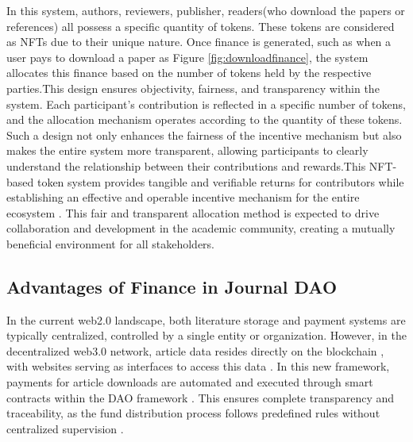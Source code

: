\documentclass[lettersize,journal]{IEEEtran}
\begin{document}
In this system, authors, reviewers, publisher, readers(who download the papers or references) all possess a specific quantity of tokens. These tokens are considered as NFTs due to their unique nature. Once finance is generated, such as when a user pays to download a paper as Figure \ref{fig:downloadfinance}, the system allocates this finance based on the number of tokens held by the respective parties.This design ensures objectivity, fairness, and transparency within the system. Each participant's contribution is reflected in a specific number of tokens, and the allocation mechanism operates according to the quantity of these tokens. Such a design not only enhances the fairness of the incentive mechanism but also makes the entire system more transparent, allowing participants to clearly understand the relationship between their contributions and rewards.This NFT-based token system provides tangible and verifiable returns for contributors while establishing an effective and operable incentive mechanism for the entire ecosystem \cite{kong2021alternative}. This fair and transparent allocation method is expected to drive collaboration and development in the academic community, creating a mutually beneficial environment for all stakeholders.




\subsection{Advantages of Finance in Journal DAO}


In the current web2.0 landscape, both literature storage and payment systems are typically centralized, controlled by a single entity or organization. However, in the decentralized web3.0 network, article data resides directly on the blockchain \cite{alabdulwahhab2018web}, with websites serving as interfaces to access this data \cite{10402553}. 
In this new framework, payments for article downloads are automated and executed through smart contracts within the DAO framework \cite{cao2022decentralized}. This ensures complete transparency and traceability, as the fund distribution process follows predefined rules without centralized supervision \cite{10302676}. 
\end{document}
